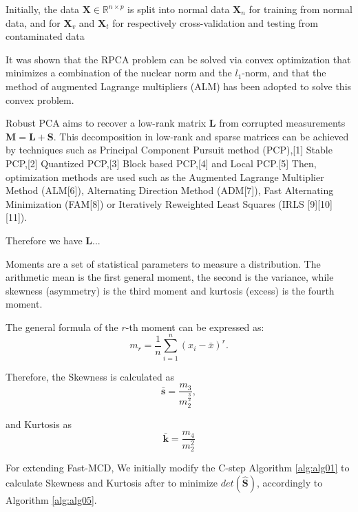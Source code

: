 \documentclass[review]{elsarticle}
\begin{document}
Initially, the data $\boldsymbol{X} \in \mathbb{R}^{n \times p}$ is split into normal data $\textbf{X}_n$ for training from normal data, and for $\textbf{X}_v$ and $\textbf{X}_t$ for respectively cross-validation and testing from contaminated data

It was shown that the RPCA problem can be solved via convex optimization that minimizes a combination of the nuclear norm and the $l_1$-norm, and that the method of augmented Lagrange multipliers (ALM) has been adopted to solve this convex problem.

Robust PCA aims to recover a low-rank matrix $\textbf{L}$ from corrupted measurements $\textbf{M} = \textbf{L} + \textbf{S}$. This decomposition in low-rank and sparse matrices can be achieved by techniques such as Principal Component Pursuit method (PCP),[1] Stable PCP,[2] Quantized PCP,[3] Block based PCP,[4] and Local PCP.[5] Then, optimization methods are used such as the Augmented Lagrange Multiplier Method (ALM[6]), Alternating Direction Method (ADM[7]), Fast Alternating Minimization (FAM[8]) or Iteratively Reweighted Least Squares (IRLS [9][10][11]).

Therefore we have $\textbf{L}$...
	    
Moments are a set of statistical parameters to measure a distribution. The arithmetic mean is the first general moment, the second is the variance, while skewness (asymmetry) is the third moment and kurtosis (excess) is the fourth moment.

The general formula of the $r$-th moment can be expressed as:
\begin{equation}\label{eq:eq05}
	m_r = \displaystyle\frac{1}{n}\displaystyle\sum_{i = 1}^{n}( x_i - \bar{x})^r. 
\end{equation}

Therefore, the Skewness is calculated as
\begin{equation}\label{eq:eq06}
	\boldsymbol{\bar{s}} = \frac{m_3}{m_2^{\frac{3}{2}}},
\end{equation}

and Kurtosis as
\begin{equation}\label{eq:eq07}
	\boldsymbol{\bar{k}} = \frac{m_4}{m_2^2} 
\end{equation}

For extending Fast-MCD, We initially modify the C-step Algorithm \ref{alg:alg01} to calculate Skewness and Kurtosis after to minimize $det(\boldsymbol{\hat{S}})$, accordingly to Algorithm \ref{alg:alg05}.
\end{document}
